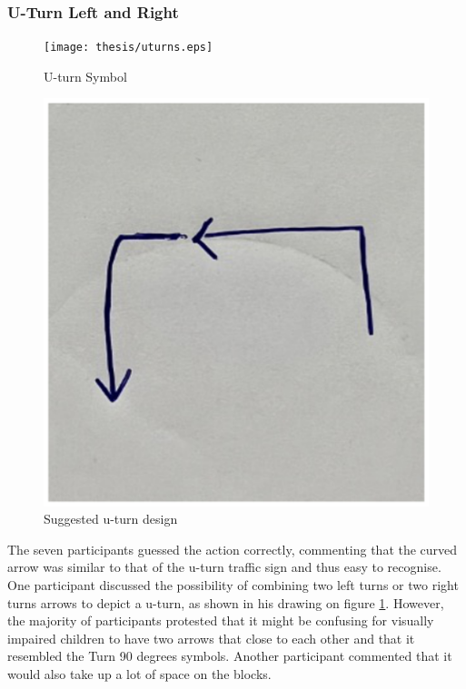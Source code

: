 \documentclass[oneside,%
                    author={Malak Hajji},
                    degree={BSc},
                    title={Designing An Accessible Ozobot Programming Platform for Students},
                  subtitle={With Mixed Visual Abilities}]{dissertation}
\begin{document}
\subsubsection{U-Turn Left and Right}
\FloatBarrier
\begin{figure}[h]
\centering
\begin{minipage}{.5\textwidth}
  \centering
  \texttt{[image: thesis/uturns.eps]}
  \caption{U-turn Symbol}
  \label{fig:initial-turn}
\end{minipage}%
\begin{minipage}{.5\textwidth}
  \centering
  \includegraphics[width=.5\textwidth]{thesis/uturn.eps}
  \caption{Suggested u-turn design}
  \label{fig:suggested-turn}
\end{minipage}
\end{figure}
\FloatBarrier
The seven participants guessed the action correctly, commenting that the curved arrow was similar to that of the u-turn traffic sign and thus easy to recognise. One participant discussed the possibility of combining two left turns or two right turns arrows to depict a u-turn, as shown in his drawing on figure \ref{fig:suggested-turn}. However, the majority of participants protested that it might be confusing for visually impaired children to have two arrows that close to each other and that it resembled the Turn 90 degrees symbols. Another participant commented that it would also take up a lot of space on the blocks.
\end{document}
